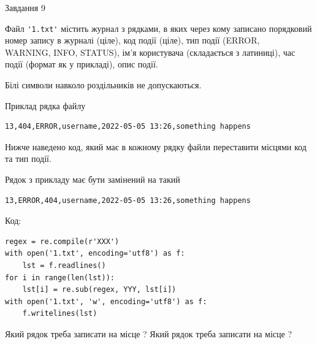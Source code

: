 \documentclass[12pt, ukrainian]{article}
\def\code#1{\Verb!#1!}
\begin{document}
{\begin{minipage}[t]{8.0cm}
\end{minipage}

               
{\begin{center}Завдання {9}\end{center}}
\vspace{-4mm}
Файл \code{'1.txt'} містить журнал з рядками, в яких через кому записано поряд\-ко\-вий номер запису в журналі (ціле), код події (ціле), тип події (ERROR,\\ WARNING, INFO, STATUS), ім'я користувача (складається з латиниці), час події (фор\-мат як у прикладі), опис події.

Білі символи навколо роздільників не допускаються.

Приклад рядка файлу



\begin{verbatim}
13,404,ERROR,username,2022-05-05 13:26,something happens
\end{verbatim}


Нижче наведено код, який має в кожному рядку файли переставити місцями код та тип події.

Рядок з прикладу має бути замінений на такий



\begin{verbatim}
13,ERROR,404,username,2022-05-05 13:26,something happens
\end{verbatim}




Код:



\begin{verbatim}
regex = re.compile(r'XXX')
with open('1.txt', encoding='utf8') as f:
    lst = f.readlines()
for i in range(len(lst)):
    lst[i] = re.sub(regex, YYY, lst[i])
with open('1.txt', 'w', encoding='utf8') as f:
    f.writelines(lst)
\end{verbatim}





Який рядок треба записати на місце  ?
Який рядок треба записати на місце  ?\par

}
\newpage
\end{document}
